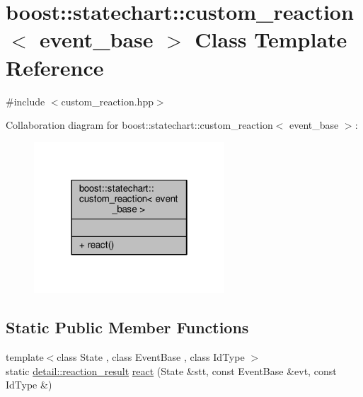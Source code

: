 \hypertarget{classboost_1_1statechart_1_1custom__reaction_3_01event__base_01_4}{}\section{boost\+:\+:statechart\+:\+:custom\+\_\+reaction$<$ event\+\_\+base $>$ Class Template Reference}
\label{classboost_1_1statechart_1_1custom__reaction_3_01event__base_01_4}


{\ttfamily \#include $<$custom\+\_\+reaction.\+hpp$>$}



Collaboration diagram for boost\+:\+:statechart\+:\+:custom\+\_\+reaction$<$ event\+\_\+base $>$\+:
\nopagebreak
\begin{figure}[H]
\begin{center}
\leavevmode
\includegraphics[width=202pt]{classboost_1_1statechart_1_1custom__reaction_3_01event__base_01_4__coll__graph}
\end{center}
\end{figure}
\subsection*{Static Public Member Functions}
\begin{DoxyCompactItemize}
\item 
{\footnotesize template$<$class State , class Event\+Base , class Id\+Type $>$ }\\static \mbox{\hyperlink{namespaceboost_1_1statechart_1_1detail_ab091bbb4c29327fb46ee479ea1b7255b}{detail\+::reaction\+\_\+result}} \mbox{\hyperlink{classboost_1_1statechart_1_1custom__reaction_3_01event__base_01_4_a176761fd7d64c28e85d3df80c49f016f}{react}} (State \&stt, const Event\+Base \&evt, const Id\+Type \&)
\end{DoxyCompactItemize}


